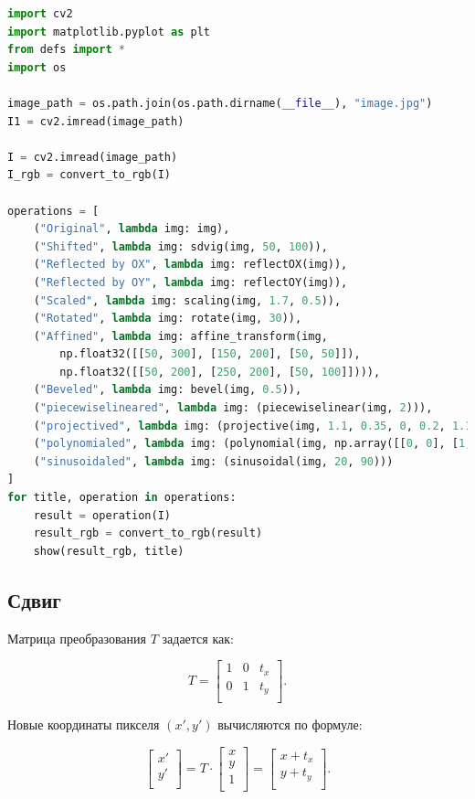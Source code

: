 \documentclass[a4paper,12pt]{article}
\begin{document}
\begin{lstlisting}[language=Python, caption=main]
import cv2
import matplotlib.pyplot as plt
from defs import *
import os

image_path = os.path.join(os.path.dirname(__file__), "image.jpg")
I1 = cv2.imread(image_path)

I = cv2.imread(image_path)
I_rgb = convert_to_rgb(I)

operations = [
    ("Original", lambda img: img),
    ("Shifted", lambda img: sdvig(img, 50, 100)),
    ("Reflected by OX", lambda img: reflectOX(img)),
    ("Reflected by OY", lambda img: reflectOY(img)),
    ("Scaled", lambda img: scaling(img, 1.7, 0.5)),
    ("Rotated", lambda img: rotate(img, 30)),
    ("Affined", lambda img: affine_transform(img, 
        np.float32([[50, 300], [150, 200], [50, 50]]), 
        np.float32([[50, 200], [250, 200], [50, 100]]))),
    ("Beveled", lambda img: bevel(img, 0.5)),
    ("piecewiselineared", lambda img: (piecewiselinear(img, 2))),
    ("projectived", lambda img: (projective(img, 1.1, 0.35, 0, 0.2, 1.1, 0, 0.00075, 0.00005, 1))),
    ("polynomialed", lambda img: (polynomial(img, np.array([[0, 0], [1, 0], [0, 1], [0.0001, 0], [0.002, 0], [0.001, 0]])))),
    ("sinusoidaled", lambda img: (sinusoidal(img, 20, 90)))
]
for title, operation in operations:
    result = operation(I)
    result_rgb = convert_to_rgb(result)
    show(result_rgb, title)
\end{lstlisting}

\subsection{Сдвиг}

Матрица преобразования \( T \) задается как:

\[
T = \begin{bmatrix}
1 & 0 & t_x \\
0 & 1 & t_y \\
\end{bmatrix}.
\]

Новые координаты пикселя \( (x', y') \) вычисляются по формуле:

\[
\begin{bmatrix}
x' \\
y' \\
\end{bmatrix}
= T \cdot
\begin{bmatrix}
x \\
y \\
1 \\
\end{bmatrix}
=
\begin{bmatrix}
x + t_x \\
y + t_y \\
\end{bmatrix}.
\]
\end{document}
